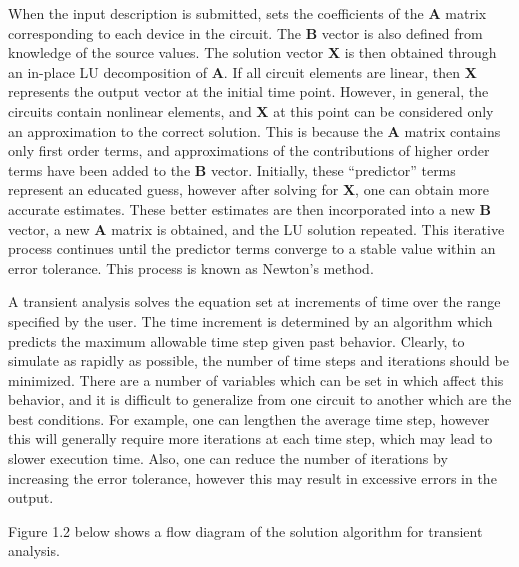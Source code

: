 When the input description is submitted, {\WRspice} sets the
coefficients of the {\bf A} matrix corresponding to each device in the
circuit.  The {\bf B} vector is also defined from knowledge of the
source values.  The solution vector {\bf X} is then obtained through
an in-place LU decomposition of {\bf A}.  If all circuit elements are
linear, then {\bf X} represents the output vector at the initial time
point.  However, in general, the circuits contain nonlinear elements,
and {\bf X} at this point can be considered only an approximation to
the correct solution.  This is because the {\bf A} matrix contains
only first order terms, and approximations of the contributions of
higher order terms have been added to the {\bf B} vector.  Initially,
these ``predictor'' terms represent an educated guess, however after
solving for {\bf X}, one can obtain more accurate estimates.  These
better estimates are then incorporated into a new {\bf B} vector, a
new {\bf A} matrix is obtained, and the LU solution repeated.  This
iterative process continues until the predictor terms converge to a
stable value within an error tolerance.  This process is known as
Newton's method.

A transient analysis solves the equation set at increments of time
over the range specified by the user.  The time increment is
determined by an algorithm which predicts the maximum allowable time
step given past behavior.  Clearly, to simulate as rapidly as
possible, the number of time steps and iterations should be minimized.
There are a number of variables which can be set in {\WRspice} which
affect this behavior, and it is difficult to generalize from one
circuit to another which are the best conditions.  For example, one
can lengthen the average time step, however this will generally
require more iterations at each time step, which may lead to slower
execution time.  Also, one can reduce the number of iterations by
increasing the error tolerance, however this may result in excessive
errors in the output.

Figure 1.2 below shows a flow diagram of the solution algorithm for
transient analysis.

